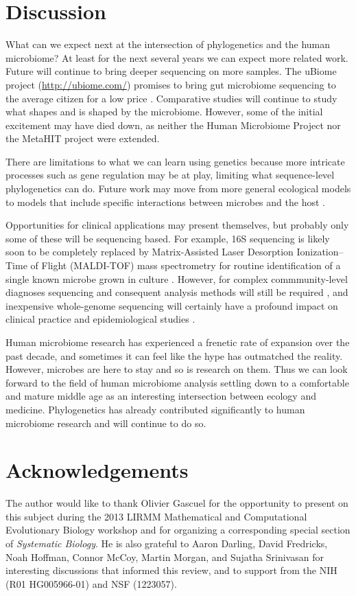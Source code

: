 \documentclass{amsart}
\newcommand{\forarxiv}[1]{#1}
\newcommand{\notforarxiv}[1]{}
\newcommand{\FIGmassTransport}{\
\begin{figure}[ht]
\begin{center}
  \forarxiv{\texttt{[image: mass\_transport.pdf]}}
\end{center}
\caption{\
  Caption goes here.
}
\label{FIGmassTransport}
\end{figure}
}
\begin{document}
\section{Discussion}
What can we expect next at the intersection of phylogenetics and the human microbiome?
At least for the next several years we can expect more related work.
Future will continue to bring deeper sequencing on more samples.
The uBiome project (\url{http://ubiome.com/}) promises to bring gut microbiome sequencing to the average citizen for a low price \citep{costandi2013citizen}.
Comparative studies will continue to study what shapes and is shaped by the microbiome.
However, some of the initial excitement may have died down, as neither the Human Microbiome Project nor the MetaHIT project were extended.

There are limitations to what we can learn using genetics because more intricate processes such as gene regulation may be at play, limiting what sequence-level phylogenetics can do.
Future work may move from more general ecological models to models that include specific interactions between microbes and the host \citep[reviewed in][]{hooper2012interactions}.

Opportunities for clinical applications may present themselves, but probably only some of these will be sequencing based.
For example, 16S sequencing is likely soon to be completely replaced by Matrix-Assisted Laser Desorption Ionization--Time of Flight (MALDI-TOF) mass spectrometry for routine identification of a single known microbe grown in culture \citep{clark2013matrix}.
However, for complex commmunity-level diagnoses sequencing and consequent analysis methods will still be required \citep[see review in][]{Rogers2013271}, and inexpensive whole-genome sequencing will certainly have a profound impact on clinical practice and epidemiological studies \citep{didelot2012transforming}.

Human microbiome research has experienced a frenetic rate of expansion over the past decade, and sometimes it can feel like the hype has outmatched the reality.
However, microbes are here to stay and so is research on them.
Thus we can look forward to the field of human microbiome analysis settling down to a comfortable and mature middle age as an interesting intersection between ecology and medicine.
Phylogenetics has already contributed significantly to human microbiome research and will continue to do so.



\section{Acknowledgements}
The author would like to thank Olivier Gascuel for the opportunity to present on this subject during the 2013 LIRMM Mathematical and Computational Evolutionary Biology workshop and for organizing a corresponding special section of \textit{Systematic Biology}.
He is also grateful to Aaron Darling, David Fredricks, Noah Hoffman, Connor McCoy, Martin Morgan, and Sujatha Srinivasan for interesting discussions that informed this review, and to support from the NIH (R01 HG005966-01) and NSF (1223057).


\notforarxiv{
\newpage
\section{Figure Legends}
\clearpage

\newpage
}



\end{document}
